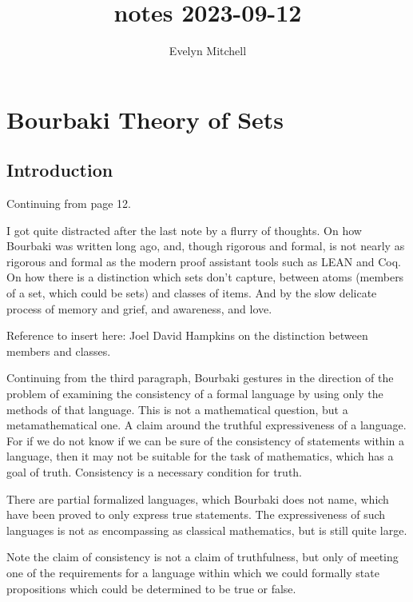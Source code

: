 \documentclass[]{scrartcl}
\title{notes 2023-09-12}
\author{Evelyn Mitchell}
\begin{document}
\maketitle

\begin{abstract}

\end{abstract}

\section{Bourbaki Theory of Sets}

\subsection{Introduction}

Continuing from page 12.

I got quite distracted after the last note by a flurry of thoughts. On how Bourbaki was written long ago, and, though rigorous and formal, is not nearly as rigorous and formal as the modern proof assistant tools such as LEAN and Coq. On how there is a distinction which sets don't capture, between atoms (members of a set, which could be sets) and classes of items. And by the slow delicate process of memory and grief, and awareness, and love.

Reference to insert here: Joel David Hampkins on the distinction between members and classes.

Continuing from the third paragraph, Bourbaki gestures in the direction of the problem of examining the consistency of a formal language  by using only the methods of that language. This is not a mathematical question, but a metamathematical one. A claim around the truthful expressiveness of a language. For if we do not know if we can be sure of the consistency of statements within a language, then it may not be suitable for the task of mathematics, which has a goal of truth. Consistency is a necessary condition for truth.

There are partial formalized languages, which Bourbaki does not name, which have been proved to only express true statements. The expressiveness of such languages is not as encompassing as classical mathematics, but is still quite large. 

Note the claim of consistency is not a claim of truthfulness, but only of meeting one of the requirements for a language within which we could formally state propositions which could be determined to be true or false. 
\end{document}
